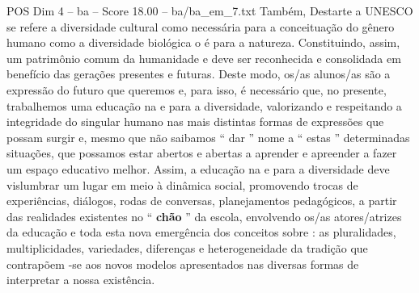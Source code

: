 \begin{textsample}{POS Dim 4 – ba – Score 18.00 – ba/ba\_em\_7.txt}
Também, Destarte a UNESCO se refere a diversidade cultural como necessária para a conceituação do gênero humano como a diversidade biológica o é para a natureza.
Constituindo, assim, um patrimônio comum da humanidade e deve ser reconhecida e consolidada em benefício das gerações presentes e futuras.
Deste modo, os/as alunos/as são a expressão do futuro que queremos e, para isso, é necessário que, no presente, trabalhemos uma educação na e para a diversidade, valorizando e respeitando a integridade do singular humano nas mais distintas formas de expressões que possam surgir e, mesmo que não saibamos “ dar ” nome a “ estas ” determinadas situações, que possamos estar abertos e abertas a aprender e apreender a fazer um espaço educativo melhor.
Assim, a educação na e para a diversidade deve vislumbrar um lugar em meio à dinâmica social, promovendo trocas de experiências, diálogos, rodas de conversas, planejamentos pedagógicos, a partir das realidades existentes no “ \textbf{chão} ” da escola, envolvendo os/as atores/atrizes da educação e toda esta nova emergência dos conceitos sobre : as pluralidades, multiplicidades, variedades, diferenças e heterogeneidade da tradição que contrapõem -se aos novos modelos apresentados nas diversas formas de interpretar a nossa existência.

\end{textsample}
